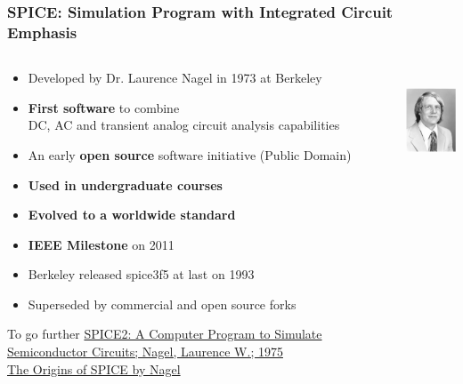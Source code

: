 
\begin{frame}
  \frametitle{SPICE: Simulation Program with Integrated Circuit Emphasis}
  \begin{columns}
    \begin{column}{.7\textwidth}
      \begin{itemize}
      \item Developed by Dr. Laurence Nagel in 1973 at Berkeley %
      \item \textbf{First software} to combine \\
        DC, AC and transient analog circuit analysis capabilities
      \item An early \textbf{open source} software initiative (Public Domain)
      \item \textbf{Used in undergraduate courses}
      \item \textbf{Evolved to a worldwide standard} %
      \item \textbf{IEEE Milestone} on 2011
      \item Berkeley released spice3f5 at last on 1993  %
      \item Superseded by commercial and open source forks \\[1em]
      \end{itemize}
      {\tiny%
        \begin{tabbing}
          To go further \=%
          \href{https://www2.eecs.berkeley.edu/Pubs/TechRpts/1975/9602.html}%
          {SPICE2: A Computer Program to Simulate Semiconductor Circuits; Nagel, Laurence W.; 1975} \\
          \> \href{http://www.omega-enterprises.net/The\%20Origins\%20of\%20SPICE.html}{The Origins of SPICE by Nagel}
        \end{tabbing}%
      }
    \end{column}
    \begin{column}{.3\textwidth}
      \begin{center}
        \includegraphics[height=3cm]{images/Larry-Nagel-portrait-young.png} \\[1cm]

\end{center}
\end{column}
\end{columns}
\end{frame}

